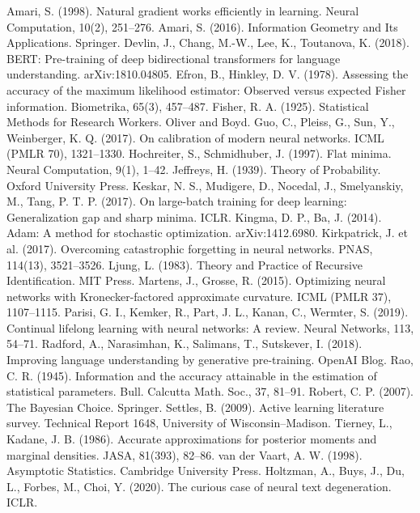 \documentclass[11pt]{article}
\begin{document}
\begin{thebibliography}{99}
 Amari, S. (1998). Natural gradient works efficiently in learning. Neural Computation, 10(2), 251--276.
 Amari, S. (2016). Information Geometry and Its Applications. Springer.
 Devlin, J., Chang, M.-W., Lee, K., Toutanova, K. (2018). BERT: Pre-training of deep bidirectional transformers for language understanding. arXiv:1810.04805.
 Efron, B., Hinkley, D. V. (1978). Assessing the accuracy of the maximum likelihood estimator: Observed versus expected Fisher information. Biometrika, 65(3), 457--487.
 Fisher, R. A. (1925). Statistical Methods for Research Workers. Oliver and Boyd.
 Guo, C., Pleiss, G., Sun, Y., Weinberger, K. Q. (2017). On calibration of modern neural networks. ICML (PMLR 70), 1321--1330.
 Hochreiter, S., Schmidhuber, J. (1997). Flat minima. Neural Computation, 9(1), 1--42.
 Jeffreys, H. (1939). Theory of Probability. Oxford University Press.
 Keskar, N. S., Mudigere, D., Nocedal, J., Smelyanskiy, M., Tang, P. T. P. (2017). On large-batch training for deep learning: Generalization gap and sharp minima. ICLR.
 Kingma, D. P., Ba, J. (2014). Adam: A method for stochastic optimization. arXiv:1412.6980.
 Kirkpatrick, J. et al. (2017). Overcoming catastrophic forgetting in neural networks. PNAS, 114(13), 3521--3526.
 Ljung, L. (1983). Theory and Practice of Recursive Identification. MIT Press.
 Martens, J., Grosse, R. (2015). Optimizing neural networks with Kronecker-factored approximate curvature. ICML (PMLR 37), 1107--1115.
 Parisi, G. I., Kemker, R., Part, J. L., Kanan, C., Wermter, S. (2019). Continual lifelong learning with neural networks: A review. Neural Networks, 113, 54--71.
 Radford, A., Narasimhan, K., Salimans, T., Sutskever, I. (2018). Improving language understanding by generative pre-training. OpenAI Blog.
 Rao, C. R. (1945). Information and the accuracy attainable in the estimation of statistical parameters. Bull. Calcutta Math. Soc., 37, 81--91.
 Robert, C. P. (2007). The Bayesian Choice. Springer.
 Settles, B. (2009). Active learning literature survey. Technical Report 1648, University of Wisconsin--Madison.
 Tierney, L., Kadane, J. B. (1986). Accurate approximations for posterior moments and marginal densities. JASA, 81(393), 82--86.
 van der Vaart, A. W. (1998). Asymptotic Statistics. Cambridge University Press.
 Holtzman, A., Buys, J., Du, L., Forbes, M., Choi, Y. (2020). The curious case of neural text degeneration. ICLR.
\end{thebibliography}
\end{document}
